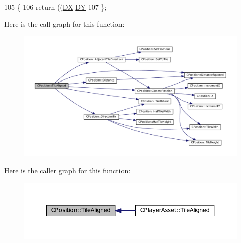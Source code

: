 \begin{DoxyCode}
105                                 \{
106             \textcolor{keywordflow}{return} ((\hyperlink{classCPosition_a28445f9b872169715919074d82044eda}{DX} %
      \hyperlink{classCPosition_a84139c9e8eb547e7cf3cb851739943a4}{DY} %
107         \};
\end{DoxyCode}
Here is the call graph for this function\+:
\nopagebreak
\begin{figure}[H]
\begin{center}
\leavevmode
\includegraphics[width=350pt]{classCPosition_abe4ef039d9bbf51cd542167b5a0cd88e_cgraph}
\end{center}
\end{figure}
Here is the caller graph for this function\+:
\nopagebreak
\begin{figure}[H]
\begin{center}
\leavevmode
\includegraphics[width=350pt]{classCPosition_abe4ef039d9bbf51cd542167b5a0cd88e_icgraph}
\end{center}
\end{figure}
\hypertarget{classCPosition_ac4f0edd9c9632f1bdca981ef5d9b71e5}{}\label{classCPosition_ac4f0edd9c9632f1bdca981ef5d9b71e5} 
